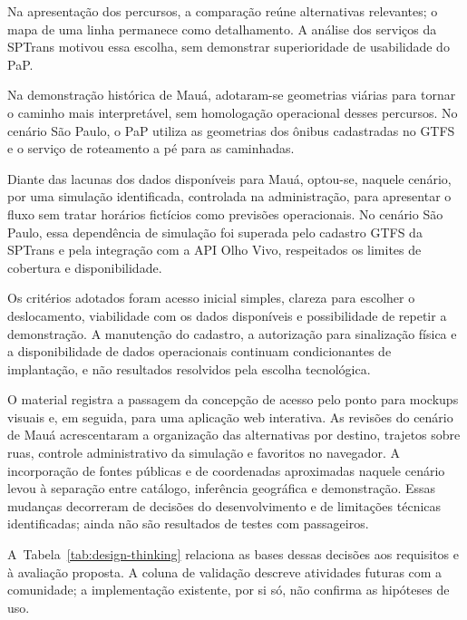 \documentclass[12pt,oneside,a4paper,brazil,chapter=TITLE]{abntex2}
\begin{document}
Na apresentação dos percursos, a comparação reúne alternativas relevantes; o mapa de uma linha permanece como detalhamento. A análise dos serviços da SPTrans motivou essa escolha, sem demonstrar superioridade de usabilidade do PaP.

Na demonstração histórica de Mauá, adotaram-se geometrias viárias para tornar o caminho mais interpretável, sem homologação operacional desses percursos. No cenário São Paulo, o PaP utiliza as geometrias dos ônibus cadastradas no GTFS e o serviço de roteamento a pé para as caminhadas.

Diante das lacunas dos dados disponíveis para Mauá, optou-se, naquele cenário, por uma simulação identificada, controlada na administração, para apresentar o fluxo sem tratar horários fictícios como previsões operacionais. No cenário São Paulo, essa dependência de simulação foi superada pelo cadastro GTFS da SPTrans e pela integração com a API Olho Vivo, respeitados os limites de cobertura e disponibilidade.

Os critérios adotados foram acesso inicial simples, clareza para escolher o deslocamento, viabilidade com os dados disponíveis e possibilidade de repetir a demonstração. A manutenção do cadastro, a autorização para sinalização física e a disponibilidade de dados operacionais continuam condicionantes de implantação, e não resultados resolvidos pela escolha tecnológica.

O material registra a passagem da concepção de acesso pelo ponto para mockups visuais e, em seguida, para uma aplicação web interativa. As revisões do cenário de Mauá acrescentaram a organização das alternativas por destino, trajetos sobre ruas, controle administrativo da simulação e favoritos no navegador. A incorporação de fontes públicas e de coordenadas aproximadas naquele cenário levou à separação entre catálogo, inferência geográfica e demonstração. Essas mudanças decorreram de decisões do desenvolvimento e de limitações técnicas identificadas; ainda não são resultados de testes com passageiros.

A~Tabela~\ref{tab:design-thinking} relaciona as bases dessas decisões aos requisitos e à avaliação proposta. A coluna de validação descreve atividades futuras com a comunidade; a implementação existente, por si só, não confirma as hipóteses de uso.
\end{document}
